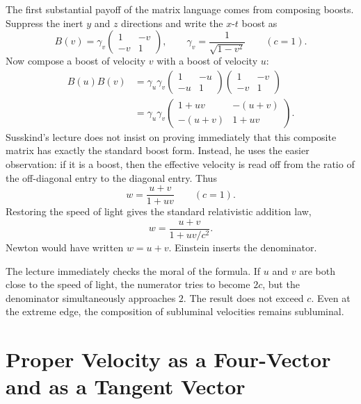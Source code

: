 The first substantial payoff of the matrix language comes from composing boosts. Suppress the inert \(y\) and \(z\) directions and write the \(x\)-\(t\) boost as
\begin{equation}
B(v)=\gamma_v
\begin{pmatrix}
1 & -v \\
-v & 1
\end{pmatrix},
\qquad
\gamma_v=\frac{1}{\sqrt{1-v^2}}
\qquad (c=1).
\end{equation}
Now compose a boost of velocity \(v\) with a boost of velocity \(u\):
\begin{align}
B(u)B(v)
&=
\gamma_u\gamma_v
\begin{pmatrix}
1 & -u \\
-u & 1
\end{pmatrix}
\begin{pmatrix}
1 & -v \\
-v & 1
\end{pmatrix} \\
&=
\gamma_u\gamma_v
\begin{pmatrix}
1+uv & -(u+v) \\
-(u+v) & 1+uv
\end{pmatrix}.
\end{align}
Susskind's lecture does not insist on proving immediately that this composite matrix has exactly the standard boost form. Instead, he uses the easier observation: if it is a boost, then the effective velocity is read off from the ratio of the off-diagonal entry to the diagonal entry. Thus
\begin{equation}
w=\frac{u+v}{1+uv}
\qquad (c=1).
\end{equation}
Restoring the speed of light gives the standard relativistic addition law,
\begin{equation}
w=\frac{u+v}{1+uv/c^2}.
\end{equation}
Newton would have written \(w=u+v\). Einstein inserts the denominator.

The lecture immediately checks the moral of the formula. If \(u\) and \(v\) are both close to the speed of light, the numerator tries to become \(2c\), but the denominator simultaneously approaches \(2\). The result does not exceed \(c\). Even at the extreme edge, the composition of subluminal velocities remains subluminal.

\section{Proper Velocity as a Four-Vector and as a Tangent Vector}

